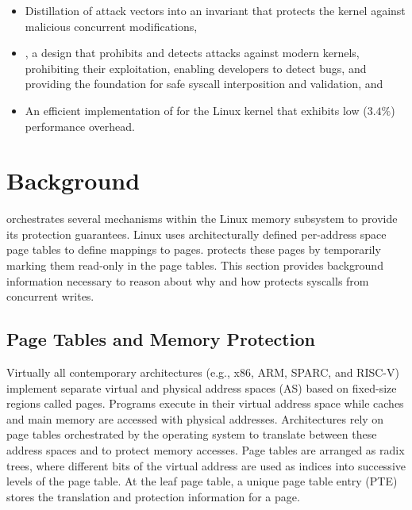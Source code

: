 \begin{itemize}
\item Distillation of \tocttou attack vectors into an invariant that protects
the kernel against malicious concurrent modifications,
\item \midas, a design that prohibits and detects
\tocttou attacks against modern kernels, prohibiting their exploitation,
enabling developers to detect \tocttou bugs, and providing the foundation for
safe syscall interposition and validation, and
\item An efficient implementation of \midas for the Linux kernel that exhibits
low ($3.4\%$) performance overhead.
\end{itemize}


\section{Background}

\midas orchestrates several mechanisms within the Linux memory subsystem
to provide its protection guarantees.
Linux uses architecturally defined per-address space page tables to define
mappings to pages.
\midas protects these pages by temporarily marking them read-only in the
page tables.
This section provides background information necessary to reason about
why and how \midas protects syscalls from concurrent writes.


\subsection{Page Tables and Memory Protection}

Virtually all contemporary architectures (e.g., x86, ARM, SPARC, and
RISC-V) implement separate virtual and physical
address spaces (AS) based on fixed-size regions called pages.
Programs execute in their virtual address space while caches and main memory
are accessed with physical addresses.
Architectures rely on page tables orchestrated by the operating system
to translate between these address spaces and to protect memory accesses.
Page tables are arranged as radix trees, where different bits of the
virtual address are used as indices into successive levels of the page table.
At the leaf page table, a unique page table entry (PTE) stores the
translation and protection information for a page.

